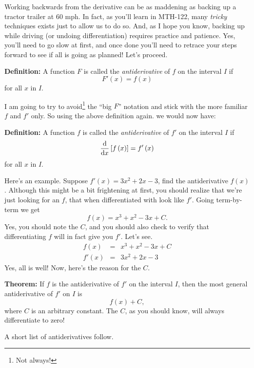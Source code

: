 \documentclass[12pt,addpoints, answers, fleqn]{exam}
\begin{document}
Working backwards from the derivative can be as maddening as backing up a tractor trailer at $60$ mph. In fact, as you'll learn in MTH-122, many \emph{tricky} techniques exists just to allow us to do so. And, as I hope you know, backing up while driving (or undoing differentiation) requires practice and patience. Yes, you'll need to go slow at first, and once done you'll need to retrace your steps forward to see if all is going as planned! Let's proceed.



\textbf{Definition:} A function $F$ is called the \emph{antiderivative} of $f$ on the interval $I$ if
\[
F'\left(x\right) = f\left( x \right)
\]
for all $x$ in $I$.



I am going to try to avoid\footnote{Not always!} the ``big $F$'' notation and stick with the more familiar $f$ and $f'$ only. So using the above definition again. we would now have:



\textbf{Definition:} A function $f$ is called the \emph{antiderivative} of $f'$ on the interval $I$ if
\[
\frac{{\rm{d}}}{{\rm{d}}x} \left[f\left(x\right)\right] = f'\left( x \right)
\]
for all $x$ in $I$.



Here's an example. Suppose $f'\left(x\right) = 3x^2 + 2x - 3$, find the antiderivative $f\left(x\right)$. Although this might be a bit frightening at first, you should realize that we're just looking for an $f$, that when differentiated with look like $f'$. Going term-by-term we get
\[
f \left( x \right) = x^3 + x^2 -3x + C.
\]
Yes, you should note the $C$, and you should also check to verify that differentiating $f$ will in fact give you $f'$. Let's see.
\begin{eqnarray*}
f \left( x \right) &=& x^3 + x^2 -3x + C\\
f' \left( x \right) &=& 3x^2 + 2x -3
\end{eqnarray*}
Yes, all is well! Now, here's the reason for the $C$.



\textbf{Theorem:} If $f$ is the antiderivative of $f'$ on the interval $I$, then the most general antiderivative of $f'$ on $I$ is
\[
f\left( x \right) + C,
\]
where $C$ is an arbitrary constant. The $C$, as you should know, will always differentiate to zero!

A short list of antiderivatives follow.
\end{document}

